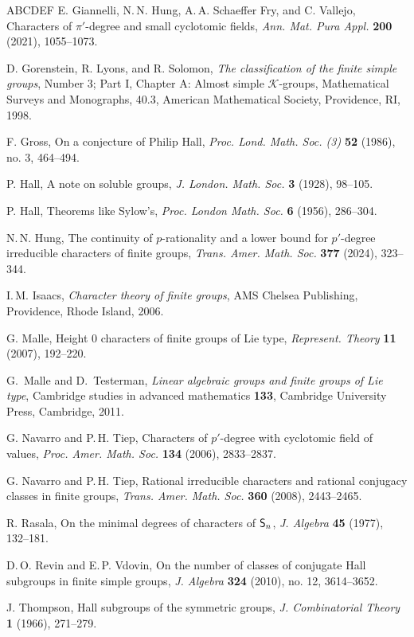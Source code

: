 \documentclass[12pt]{amsart}
\theoremstyle{definition}
\numberwithin{equation}{section}
\newcommand{\Sy}{\textup{\textsf{S}}}
\begin{document}
\begin{thebibliography}{ABCDEF}
E. Giannelli, N.\,N. Hung, A.\,A. Schaeffer Fry, and C. Vallejo,
Characters of $\pi'$-degree and small cyclotomic fields, \emph{Ann.
Mat. Pura Appl.} \textbf{200} (2021), 1055--1073.

D. Gorenstein, R. Lyons, and R. Solomon, \emph{The classification of
the finite simple groups}, Number 3; Part I, Chapter A: Almost
simple $\mathcal{K}$-groups, Mathematical Surveys and Monographs,
40.3, American Mathematical Society, Providence, RI, 1998.

F. Gross, On a conjecture of Philip Hall, \emph{Proc. Lond. Math.
Soc. (3)} \textbf{52} (1986), no. 3, 464--494.

{P. Hall}, A note on soluble groups,
\emph{J. London. Math. Soc.} \textbf{3} (1928), 98--105.

{P. Hall}, Theorems like Sylow's,
\emph{Proc. London Math. Soc.} \textbf{6} (1956), 286--304.



{N.\,N. Hung}, The continuity of $p$-rationality and a lower bound
for $p'$-degree irreducible characters of finite groups,
\emph{Trans. Amer. Math. Soc.} \textbf{377} (2024), 323--344.

I.\,M. Isaacs, {\it Character theory of finite groups}, AMS Chelsea
Publishing, Providence, Rhode Island, 2006.

G. Malle, Height 0 characters of finite groups of Lie type,
\emph{Represent. Theory} \textbf{11} (2007), 192--220.

G.~Malle and D.~Testerman, \emph{Linear algebraic groups and finite
 groups of Lie type}, Cambridge studies in advanced mathematics
\textbf{133}, Cambridge University Press, Cambridge, 2011.


G. Navarro and P.\,H. Tiep, Characters of $p'$-degree with
cyclotomic field of values, \emph{Proc. Amer. Math. Soc.}
\textbf{134} (2006), 2833--2837.

 G. Navarro and P.\,H. Tiep, Rational irreducible
 characters and rational conjugacy classes in finite groups,
 \emph{Trans. Amer. Math. Soc.}
 \textbf{360} (2008), 2443--2465.

R. Rasala, On the minimal degrees of characters of $\Sy_n$, \emph{J.
Algebra} \textbf{45} (1977), 132--181.

D.\,O. Revin and E.\,P. Vdovin, On the number of classes of
conjugate Hall subgroups in finite simple groups, \emph{J. Algebra}
\textbf{324} (2010), no. 12, 3614--3652.



J. Thompson, Hall subgroups of the symmetric groups,
\emph{J. Combinatorial Theory} \textbf{1} (1966), 271--279.

\end{thebibliography}
\end{document}
